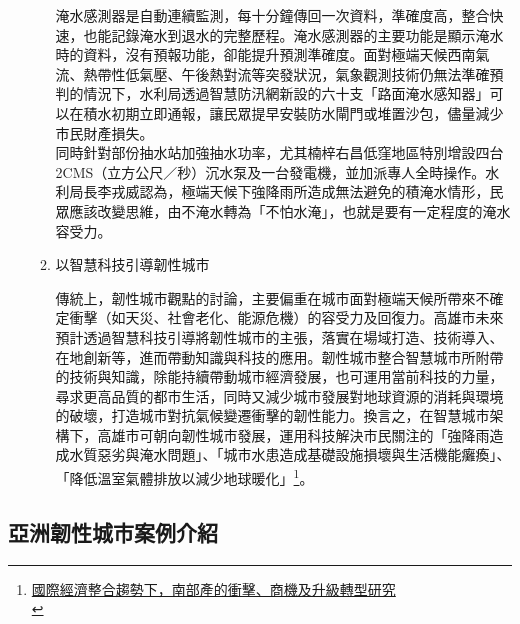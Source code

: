 \documentclass[a4paper,12pt]{article}
\begin{document}
\begin{enumerate}
\begin{enumerate}
淹水感測器是自動連續監測，每十分鐘傳回一次資料，準確度高，整合快速，也能記錄淹水到退水的完整歷程。淹水感測器的主要功能是顯示淹水時的資料，沒有預報功能，卻能提升預測準確度。面對極端天候西南氣流、熱帶性低氣壓、午後熱對流等突發狀況，氣象觀測技術仍無法準確預判的情況下，水利局透過智慧防汛網新設的六十支「路面淹水感知器」可以在積水初期立即通報，讓民眾提早安裝防水閘門或堆置沙包，儘量減少市民財產損失。\\

同時針對部份抽水站加強抽水功率，尤其楠梓右昌低窪地區特別增設四台2CMS（立方公尺／秒）沉水泵及一台發電機，並加派專人全時操作。水利局長李戎威認為，極端天候下強降雨所造成無法避免的積淹水情形，民眾應該改變思維，由不淹水轉為「不怕水淹」，也就是要有一定程度的淹水容受力。\\
\item 以智慧科技引導韌性城市
\label{sec:org7aa95cf}

傳統上，韌性城市觀點的討論，主要偏重在城市面對極端天候所帶來不確定衝擊（如天災、社會老化、能源危機）的容受力及回復力。高雄市未來預計透過智慧科技引導將韌性城市的主張，落實在場域打造、技術導入、在地創新等，進而帶動知識與科技的應用。韌性城市整合智慧城市所附帶的技術與知識，除能持續帶動城市經濟發展，也可運用當前科技的力量，尋求更高品質的都市生活，同時又減少城市發展對地球資源的消耗與環境的破壞，打造城市對抗氣候變遷衝擊的韌性能力。換言之，在智慧城市架構下，高雄市可朝向韌性城市發展，運用科技解決市民關注的「強降雨造成水質惡劣與淹水問題」、「城市水患造成基礎設施損壞與生活機能癱瘓」、「降低溫室氣體排放以減少地球暖化」\footnote{\href{https://www.moea.gov.tw/Mns/populace/information/wHandInformation\_File.ashx?info\_id=1169}{國際經濟整合趨勢下，南部產的衝擊、商機及升級轉型研究}\\}。\\
\newpage
\end{enumerate}
\end{enumerate}

\subsection{亞洲韌性城市案例介紹}
\label{sec:org009d813}
\end{document}
